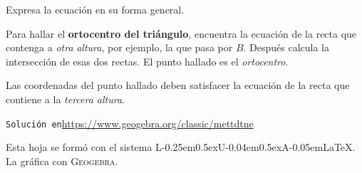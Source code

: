 \documentclass[12pt,letterpaper]{article}
\newcommand{\LuaLaTeX}{L\kern-0.25em\raise0.5ex\hbox{\tiny U}\kern-0.04em\raise0.5ex\hbox{\tiny A}\kern-0.05em\LaTeX}
\begin{document}
Expresa la ecuación en su forma general. 

Para hallar el \textbf{\color{purple}ortocentro del triángulo}, encuentra la ecuación de la recta que contenga a \emph{otra} \emph{altura}, por ejemplo, la que pasa por $B$. Después calcula la intersección de esas dos rectas. El punto hallado es el \emph{ortocentro}.

Las coordenadas del punto hallado deben satisfacer la ecuación de la recta que contiene a la \emph{tercera altura}.
\vfill

\begin{center}
	\texttt{\color{brown}Solución en}\enspace \url{https://www.geogebra.org/classic/mettdtne}
\end{center}


\begin{center}
	{\footnotesize\color{olive} Esta hoja se formó con el sistema \LuaLaTeX. La gráfica con \textsc{Geogebra}.}
\end{center}
\end{document}
